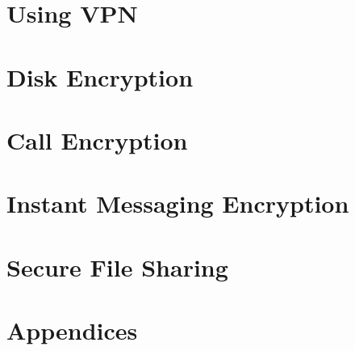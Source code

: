 \documentclass[oribibl,a4paper]{book}
\begin{document}
\chapter{Using VPN}

\clearpage

\clearpage

\clearpage

\clearpage

\clearpage
\graphicspath{{./chapter_10_disk_encryption/}}
\chapter{Disk Encryption}

\clearpage

\clearpage

\clearpage

\clearpage
\graphicspath{{./chapter_11_call_encryption/}}
\chapter{Call Encryption}

\clearpage
\graphicspath{{./chapter_12_instant_messaging_encryption/}}
\chapter{Instant Messaging Encryption}

\clearpage
\graphicspath{{./chapter_13_secure_file_sharing/}}
\chapter{Secure File Sharing}

\clearpage
\graphicspath{{./chapter_14_appendices/}}
\chapter{Appendices}
\appendix

\clearpage

\clearpage

\clearpage
\end{document}
